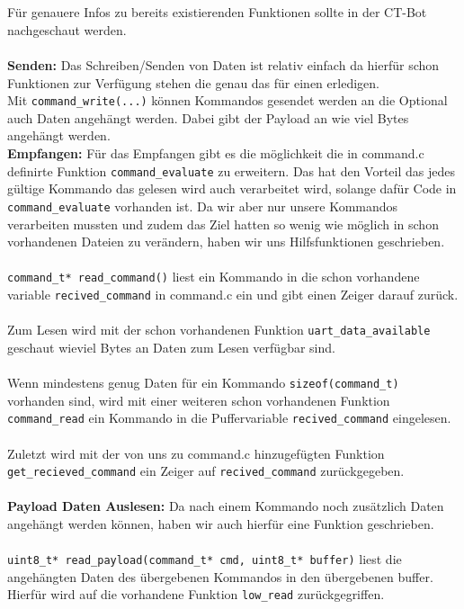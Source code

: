  \newpage


 \\
\\
Für genauere Infos zu bereits existierenden Funktionen sollte in der CT-Bot nachgeschaut werden.\\
\\
\textbf{Senden:} Das Schreiben/Senden von Daten ist relativ einfach da hierfür schon Funktionen zur Verfügung stehen die genau das für einen erledigen.\\
Mit \verb|command_write(...)| können Kommandos gesendet werden an die Optional auch Daten angehängt werden. Dabei gibt der Payload an wie viel Bytes angehängt werden. 
\\
\textbf{Empfangen:} Für das Empfangen gibt es die möglichkeit die in command.c definirte Funktion \verb|command_evaluate| zu erweitern. Das hat den Vorteil das jedes gültige Kommando das gelesen wird auch verarbeitet wird, solange dafür Code in \verb|command_evaluate| vorhanden ist.
Da wir aber nur unsere Kommandos verarbeiten mussten und zudem das Ziel hatten so wenig wie möglich in schon vorhandenen Dateien zu verändern, haben wir uns Hilfsfunktionen geschrieben.\\
\\
\verb|command_t* read_command()| liest ein Kommando in die schon vorhandene variable \verb|recived_command| in command.c ein und gibt einen Zeiger darauf zurück.\\
\\
Zum Lesen wird mit der schon vorhandenen Funktion \verb|uart_data_available| geschaut wieviel Bytes an Daten zum Lesen verfügbar sind.\\
\\
Wenn mindestens genug Daten für ein Kommando \verb|sizeof(command_t)| vorhanden sind, wird mit einer weiteren schon vorhandenen Funktion \verb|command_read| ein Kommando in die Puffervariable \verb|recived_command| eingelesen.\\
\\
Zuletzt wird mit der von uns zu command.c hinzugefügten Funktion \verb|get_recieved_command| ein Zeiger auf \verb|recived_command| zurückgegeben.\\
\\
\textbf{Payload Daten Auslesen:} Da nach einem Kommando noch zusätzlich Daten angehängt werden können, haben wir auch hierfür eine Funktion geschrieben.\\
\\
\verb|uint8_t* read_payload(command_t* cmd, uint8_t* buffer)| liest die angehängten Daten des übergebenen Kommandos in den übergebenen buffer.\\ Hierfür wird auf die vorhandene Funktion \verb|low_read| zurückgegriffen.

